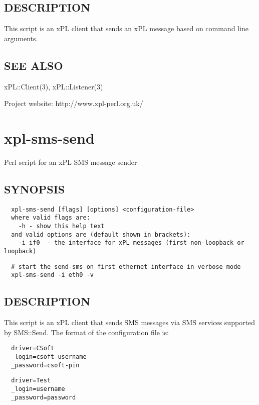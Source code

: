 \subsection*{DESCRIPTION\label{xpl-sender_DESCRIPTION}}


This script is an xPL client that sends an xPL message based on
command line arguments.

\subsection*{SEE ALSO\label{xpl-sender_SEE_ALSO}}


xPL::Client(3), xPL::Listener(3)



Project website: http://www.xpl-perl.org.uk/

\section{xpl-sms-send\label{xpl-sms-send}}


Perl script for an xPL SMS message sender

\subsection*{SYNOPSIS\label{xpl-sms-send_SYNOPSIS}}
\begin{verbatim}
  xpl-sms-send [flags] [options] <configuration-file>
  where valid flags are:
    -h - show this help text
  and valid options are (default shown in brackets):
    -i if0  - the interface for xPL messages (first non-loopback or loopback)
\end{verbatim}
\begin{verbatim}
  # start the send-sms on first ethernet interface in verbose mode
  xpl-sms-send -i eth0 -v
\end{verbatim}
\subsection*{DESCRIPTION\label{xpl-sms-send_DESCRIPTION}}


This script is an xPL client that sends SMS messages via SMS services
supported by SMS::Send.  The format of the configuration file is:

\begin{verbatim}
  driver=CSoft
  _login=csoft-username
  _password=csoft-pin
\end{verbatim}
\begin{verbatim}
  driver=Test
  _login=username
  _password=password
\end{verbatim}


